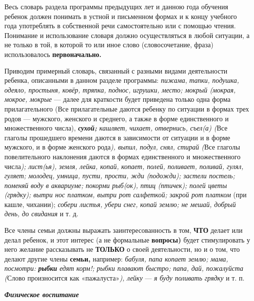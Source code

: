 \documentclass[a5paper]{book}
\renewcommand{\emph}[1]{\textit{#1}}
\begin{document}
Весь словарь раздела программы предыдущих лет и данною года обучения
ребенок должен понимать в устной и письменном формах и к концу учебного
года употреблять в собственной речи самостоятельно или с помощью чтения.
Понимание и использование словаря должно осуществляться в любой
ситуации, а не только в той, в которой то или иное слово
(словосочетание, фраза) использовалось \textbf{первоначально.}

Приводим примерный словарь, связанный с разными видами деятельности
ребенка, описанными в данном разделе программы: \emph{пижама},
\emph{тапки, подушка, одеяло, простыня, ковёр, тряпка, поднос, игрушки,
место; мокрый (мокрая, мокрое, мокрые} --- далее для краткости будет
приведена только одна форма прилагательного (Все прилагательные даются
ребенку по ситуации в формах трех родов --- мужского, женского и
среднего, а также в форме единственного и множественного числа),
\emph{\textbf{сухой;} кашляет, чихает, отвернись, съел(а) (}Все глаголы
прошедшего времени даются в зависимости от ситуации и в форме мужского,
и в форме женского рода\emph{), выпил, подул, снял, стирай (}Все глаголы
повелительного наклонения даются в формах единственного и множественного
числа\emph{); лист(ья), земля, лейка, копай, копает, полей, поливает,
поливай, гулял, гуляет; молодец, умница, пусти, прости, жди (подожди);
застели постель; поменяй воду в аквариуме; покорми рыб(ок), птиц
(птичек); полей цветы (грядку); вытри нос платком, вытри рот салфеткой;
закрой рот платком} (при кашле, чихании); \emph{собери листья, убери
снег, копай землю; не мешай, добрый день, до свидания} и т. д.

Все члены семьи должны выражать заинтересованность в том, \textbf{ЧТО}
делает или делал ребенок, и этот интерес (а не формальные
\textbf{вопросы)} будет стимулировать у него желание рассказывать не
\textbf{ТОЛЬКО} о своей деятельности, но и о том, что делают другие
члены \textbf{семьи,} например: \emph{бабуля, папа копает землю; мама,
посмотри: \textbf{рыбки} едят корм!; рыбки плавают быстро; папа, дай,
пожалуйста (}Слово произносится как «пажалуста»\emph{), лейку} ---
\emph{я буду поливать грядку} и т. п.

\emph{\textbf{Физическое воспитание}}
\end{document}
